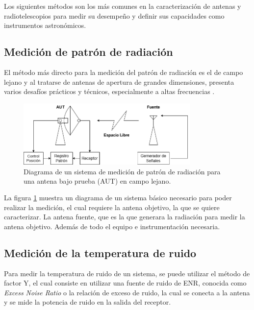 Los siguientes métodos son los más comunes en la caracterización de antenas y radiotelescopios para medir su desempeño y definir sus capacidades como instrumentos astronómicos.\\

\subsection{Medición de patrón de radiación}

El método más directo para la medición del patrón de radiación es el de campo lejano y al tratarse de antenas de apertura de grandes dimensiones, presenta varios desafíos prácticos y técnicos, especialmente a altas frecuencias \cite{Astudillo2014}.\\

\begin{figure}
    \centering
    \includegraphics[width = 0.8\textwidth]{img/farfielddiag}
    \caption{Diagrama de un sistema de medición de patrón de radiación para una antena bajo prueba (AUT) en campo lejano.}
    \label{fig:farfield}
\end{figure}

La figura \ref{fig:farfield} muestra un diagrama de un sistema básico necesario para poder realizar la medición, el cual requiere la antena objetivo, la que se quiere caracterizar. La antena fuente, que es la que generara la radiación para medir la antena objetivo. Además de todo el equipo e instrumentación necesaria.\\

\subsection{Medición de la temperatura de ruido}

Para medir la temperatura de ruido de un sistema, se puede utilizar el método de factor Y, el cual consiste en utilizar una fuente de ruido de ENR, conocida como \textit{Excess Noise Ratio} o la relación de exceso de ruido, la cual se conecta a la antena y se mide la potencia de ruido en la salida del receptor.\\

